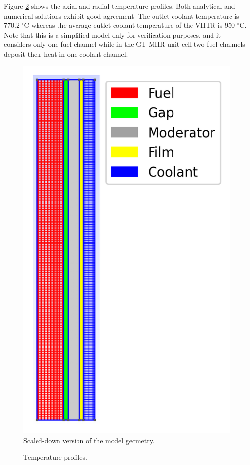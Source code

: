 Figure \ref{fig:th-ver-results} shows the axial and radial temperature profiles.
Both analytical and numerical solutions exhibit good agreement.
The outlet coolant temperature is 770.2 $^{\circ}$C whereas the average outlet coolant temperature of the VHTR is 950 $^{\circ}$C.
Note that this is a simplified model only for verification purposes, and it considers only one fuel channel while in the GT-MHR unit cell two fuel channels deposit their heat in one coolant channel.

\begin{figure}[htbp!]
	\centering
	\includegraphics[width=0.3\linewidth]{figures-thermal/2D-preliminar-mesh2}
	\hfill
	\caption{Scaled-down version of the model geometry.}
	\label{fig:th-ver-mesh}
\end{figure}

\begin{figure}[htbp!]
	\centering
	\hfill
    \caption{Temperature profiles.}
	\label{fig:th-ver-results}
\end{figure}


